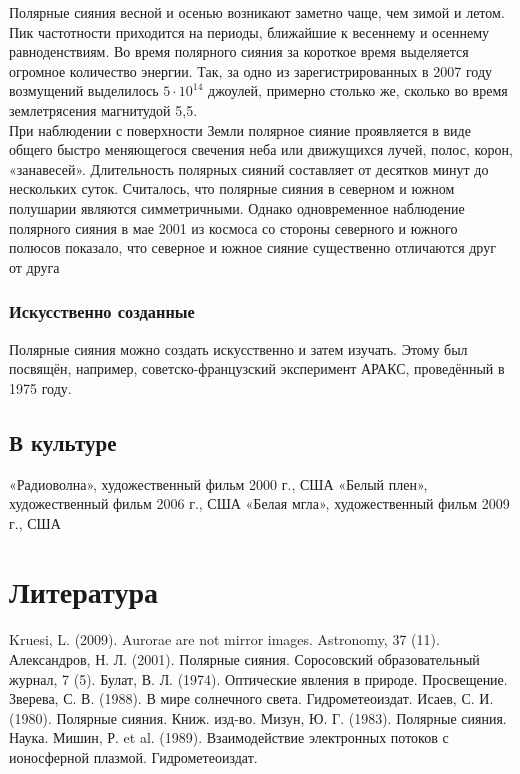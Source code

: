\documentclass[a4paper,14pt]{article}
\begin{document}
\indent Полярные сияния весной и осенью возникают заметно чаще, чем зимой и летом. Пик частотности приходится на периоды, ближайшие к 
весеннему и осеннему равноденствиям. Во время полярного сияния за короткое время выделяется огромное количество энергии. Так, за одно из 
зарегистрированных в 2007 году возмущений выделилось $5\cdot10^{14}$ джоулей, примерно столько же, сколько во время землетрясения
 магнитудой 5,5. \\
\indent При наблюдении с поверхности Земли полярное сияние проявляется в виде общего быстро меняющегося свечения неба или движущихся лучей,
полос, корон, «занавесей». Длительность полярных сияний составляет от десятков минут до нескольких суток. Считалось, что полярные
сияния в северном и южном полушарии являются симметричными. Однако одновременное наблюдение полярного сияния в мае 2001 из космоса
со стороны северного и южного полюсов показало, что северное и южное сияние существенно отличаются друг от друга

\subsubsection{Искусственно созданные}
Полярные сияния можно создать искусственно и затем изучать. Этому был посвящён, например, советско-французский эксперимент АРАКС,
проведённый в 1975 году.

\subsection{В культуре}
 «Радиоволна», художественный фильм 2000 г., США
 «Белый плен», художественный фильм 2006 г., США
 «Белая мгла», художественный фильм 2009 г., США

\section{Литература}
Kruesi, L. (2009). Aurorae are not mirror images. Astronomy, 37 (11).
Александров, Н. Л. (2001). Полярные сияния. Соросовский образовательный журнал, 7 (5).
Булат, В. Л. (1974). Оптические явления в природе. Просвещение.
Зверева, С. В. (1988). В мире солнечного света. Гидрометеоиздат.
Исаев, С. И. (1980). Полярные сияния. Книж. изд-во.
Мизун, Ю. Г. (1983). Полярные сияния. Наука.
Мишин, Р. et al. (1989). Взаимодействие электронных потоков с ионосферной плазмой. Гидрометеоиздат.
\end{document}
